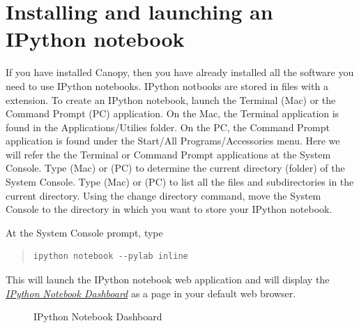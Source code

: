 \documentclass[letterpaper,10pt,english]{sphinxmanual}
\begin{document}
\section{Installing and launching an IPython notebook}
\label{apdx2/apdx2_ipynb:installing-and-launching-an-ipython-notebook}
If you have installed Canopy, then you have already installed all the software you need to use IPython notebooks.  IPython notbooks are stored in files with a  extension.  To create an IPython notebook, launch the Terminal (Mac) or the Command Prompt (PC) application.  On the Mac, the Terminal application is found in the Applications/Utilies folder.  On the PC, the Command Prompt application is found under the Start/All Programs/Accessories menu.  Here we will refer the the Terminal or Command Prompt applications at the System Console.  Type  (Mac) or  (PC) to determine the current directory (folder) of the System Console.  Type  (Mac) or  (PC) to list all the files and subdirectories in the current directory.  Using the  change directory command, move the System Console to the directory in which you want to store your IPython notebook.

At the System Console prompt, type
\begin{quote}

\begin{Verbatim}[commandchars=\\\{\}]
ipython notebook --pylab inline
\end{Verbatim}
\end{quote}

This will launch the IPython notebook web application and will display the {\hyperref[apdx2/apdx2_ipynb:fig-nbdashboard]{\emph{IPython Notebook Dashboard}}} as a page in your default web browser.
\begin{figure}[htbp]
\centering
\capstart

\caption{IPython Notebook Dashboard}\label{apdx2/apdx2_ipynb:fig-nbdashboard}\end{figure}
\end{document}
